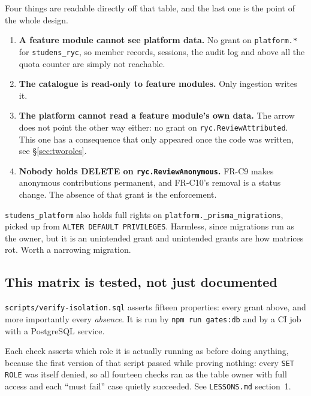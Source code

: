 \documentclass[11pt,a4paper]{article}
\begin{document}
Four things are readable directly off that table, and the last one is the point
of the whole design.

\begin{enumerate}[leftmargin=*,itemsep=1.2mm]
\item \textbf{A feature module cannot see platform data.} No grant on
  \texttt{platform.*} for \texttt{studens\_ryc}, so member records, sessions,
  the audit log and above all the quota counter are simply not reachable.
\item \textbf{The catalogue is read-only to feature modules.} Only ingestion
  writes it.
\item \textbf{The platform cannot read a feature module's own data.} The arrow
  does not point the other way either: no grant on
  \texttt{ryc.ReviewAttributed}. This one has a consequence that only appeared
  once the code was written, see \S\ref{sec:tworoles}.
\item \textbf{Nobody holds DELETE on \texttt{ryc.ReviewAnonymous}.} FR-C9 makes
  anonymous contributions permanent, and FR-C10's removal is a status change.
  The absence of that grant is the enforcement.
\end{enumerate}

\begin{careful}
\texttt{studens\_platform} also holds full rights on
\texttt{platform.\_prisma\_migrations}, picked up from
\texttt{ALTER DEFAULT PRIVILEGES}. Harmless, since migrations run as the owner,
but it is an unintended grant and unintended grants are how matrices rot.
Worth a narrowing migration.
\end{careful}

\subsection{This matrix is tested, not just documented}

\texttt{scripts/verify-isolation.sql} asserts fifteen properties: every grant
above, and more importantly every \emph{absence}. It is run by
\texttt{npm run gates:db} and by a CI job with a PostgreSQL service.

Each check asserts which role it is actually running as before doing anything,
because the first version of that script passed while proving nothing: every
\texttt{SET ROLE} was itself denied, so all fourteen checks ran as the table
owner with full access and each ``must fail'' case quietly succeeded. See
\texttt{LESSONS.md} section~1.

\newpage
\end{document}
